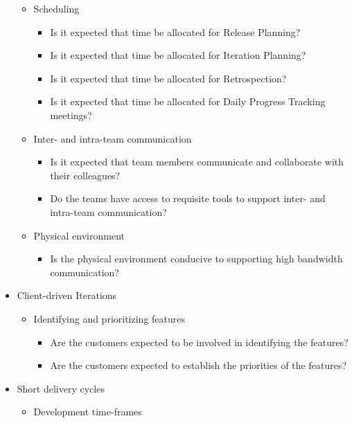 \begin{appendices}
\begin{itemize}
\begin{itemize}
\begin{itemize}
				\end{itemize}	
			\item Scheduling
				\begin{itemize}
					\item Is it expected that time be allocated for Release Planning?
					\item Is it expected that time be allocated for Iteration Planning?
					\item Is it expected that time be allocated for Retrospection? 
					\item Is it expected that time be allocated for Daily Progress Tracking meetings?
				\end{itemize}
			\item Inter- and intra-team communication
				\begin{itemize}
					\item Is it expected that team members communicate and collaborate with their colleagues?
					\item Do the teams have access to requisite tools to support inter- and intra-team communication?
				\end{itemize}
			\item Physical environment
				\begin{itemize}
					\item Is the physical environment conducive to supporting high bandwidth communication?
				\end{itemize}
		\end{itemize}
	\item Client-driven Iterations
		\begin{itemize}
			\item Identifying and prioritizing features
				\begin{itemize}
					\item Are the customers expected to be involved in identifying the features?
					\item Are the customers expected to establish the priorities of the features?
				\end{itemize}
		\end{itemize}
	\item Short delivery cycles
		\begin{itemize}
			\item Development time-frames
				\begin{itemize}

\end{itemize}
\end{itemize}
\end{itemize}
\end{appendices}
